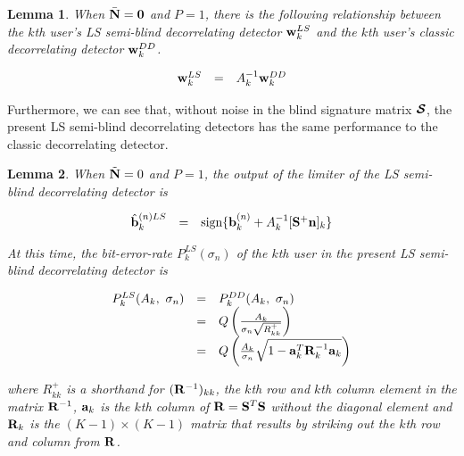 \documentclass[a4paper,11pt,fleqn]{article}
\newtheorem{lemma}{Lemma}
\newcommand{\ba}{{\bf a}}
\newcommand{\bb}{{\bf b}}
\newcommand{\bn}{{\bf n}}
\newcommand{\bw}{{\bf w}}
\newcommand{\bN}{{\bf N}}
\newcommand{\bS}{{\bf S}}
\newcommand{\bR}{{\bf R}}
\newcommand{\bcS}{{\mbox {\boldmath ${\cal S}$}}}
\begin{document}
\begin{lemma}
When $\bar{\bN}=\mathbf{0}$ and $P=1$, there is the following
relationship between the $k$th user's LS semi-blind decorrelating
detector $\bw_k^{LS}$ and the $k$th user's classic decorrelating
detector $\bw_k^{DD}$.

\begin{equation}
\begin{array}{rcl}
\bw_k^{LS}&=&A_k^{-1}\bw_k^{DD}
\end{array}
\end{equation} \label{wN0}
\end{lemma}



Furthermore, we can see that, without noise in the blind signature
matrix $\bcS$, the present LS semi-blind decorrelating detectors
has the same performance to the classic decorrelating detector.

\begin{lemma}
When $\tilde{\bN}=0$ and $P=1$, the output of the limiter of the
LS semi-blind decorrelating detector is

\begin{equation}
\begin{array}{rcl}
\hat{\bb}_k^{(n)LS}&=&\mbox{sign}\{\bb_k^{(n)}+A_k^{-1}[\bS^+\bn]_k\}
\end{array} \label{b_LS_N0}
\end{equation}

At this time, the bit-error-rate $P_k^{LS}(\sigma_{n})$ of the
$k$th user in the present LS semi-blind decorrelating detector is

\begin{equation}
\begin{array}{rcl}
P_k^{LS}(A_k,\ \sigma_{n})&=&P_k^{DD}(A_k,\ \sigma_{n})\\
 &=&Q\left({A_k\over \sigma_{n}\sqrt{R_{kk}^+}}\right)\\
 &=&Q\left({A_k\over \sigma_{n}}\sqrt{1-\ba_k^T\bR_{k}^{-1}\ba_k}\right)
\end{array}
\end{equation}

\noindent where $R_{kk}^+$ is a shorthand for $(\bR^{-1})_{kk}$,
the $k$th row and $k$th column element in the matrix $\bR^{-1}$,
$\ba_k$ is the $k$th column of $\bR=\bS^T\bS$ without the diagonal
element and $\bR_k$ is the $(K-1)\times (K-1)$ matrix that results
by striking out the $k$th row and column from $\bR$.
\end{lemma}
\end{document}
